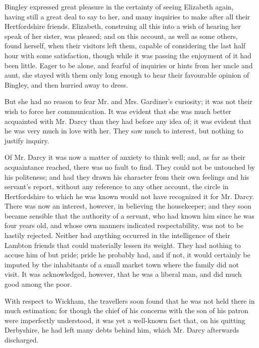 \documentclass[10pt]{book}
\begin{document}
   Bingley expressed great pleasure in the certainty of seeing Elizabeth
again, having still a great deal to say to her, and many inquiries to
make after all their Hertfordshire friends. Elizabeth, construing all
this into a wish
   of hearing her speak of her sister, was pleased; and
on this account, as well as some others, found herself, when their
visitors left them, capable of considering the last half hour with some
satisfaction, though while it was passing the enjoyment of it had been
little. Eager to be alone, and fearful of inquiries or hints from her
uncle and aunt, she stayed with them only long enough to hear their
favourable opinion of Bingley, and then hurried away to dress.
  

   But she had no reason to fear Mr. and Mrs. Gardiner’s curiosity; it was
not their wish to force her communication. It was evident that she was
much better acquainted with Mr. Darcy than they had before any idea of;
it was evident that he was very much in love with her. They saw much to
interest, but nothing to justify inquiry.
  

   Of Mr. Darcy it was now a matter of anxiety to think well; and, as far
as their acquaintance reached, there was no fault to find. They could
not be untouched by his politeness; and had they drawn his character
from their own feelings and his servant’s report, without any reference
to any other account, the circle in Hertfordshire to which he was known
would not have recognized it for Mr. Darcy. There was now an interest,
however, in believing the housekeeper; and they soon became sensible
that the authority of a servant, who had known him since he was four
years old, and whose own manners indicated respectability, was not to be
hastily rejected. Neither had anything occurred in the intelligence of
their Lambton friends that could materially lessen its weight. They had
nothing to accuse him of but pride; pride he probably had, and if not,
it would certainly be imputed by the inhabitants of a small market town
   where the family did not visit. It was acknowledged, however, that he
was a liberal man, and did much good among the poor.
  

   With respect to Wickham, the travellers soon found that he was not held
there in much estimation; for though the chief of his concerns with the
son of his patron were imperfectly understood, it was yet a well-known
fact that, on his quitting Derbyshire, he had left many debts behind
him, which Mr. Darcy afterwards discharged.
  
\end{document}
